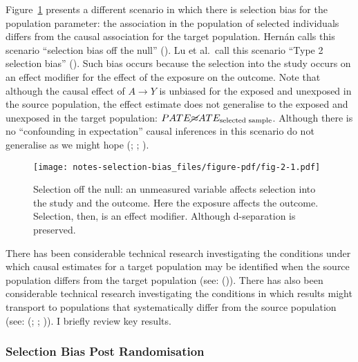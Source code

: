 \documentclass[
  singlecolumn,
  9pt]{article}
\begin{document}
Figure~\ref{fig-2} presents a different scenario in which there is
selection bias for the population parameter: the association in the
population of selected individuals differs from the causal association
for the target population. Hernán calls this scenario ``selection bias
off the null'' (). Lu et
al.~call this scenario ``Type 2 selection bias''
(). Such bias occurs because
the selection into the study occurs on an effect modifier for the effect
of the exposure on the outcome. Note that although the causal effect of
\(A\to Y\) is unbiased for the exposed and unexposed in the source
population, the effect estimate does not generalise to the exposed and
unexposed in the target population:
\(PATE \cancel{\approx} ATE_{\text{selected sample}}\). Although there
is no ``confounding in expectation'' causal inferences in this scenario
do not generalise as we might hope (; ; ).

\begin{figure}

{\centering \texttt{[image: notes-selection-bias\_files/figure-pdf/fig-2-1.pdf]}

}

\caption{\label{fig-2}Selection off the null: an unmeasured variable
affects selection into the study and the outcome. Here the exposure
affects the outcome. Selection, then, is an effect modifier. Although
d-separation is preserved.}

\end{figure}

There has been considerable technical research investigating the
conditions under which causal estimates for a target population may be
identified when the source population differs from the target population
(see: ()). There has also
been considerable technical research investigating the conditions in
which results might transport to populations that systematically differ
from the source population (see:
(;
;
)). I briefly review key
results.

\subsubsection{Selection Bias Post
Randomisation}\label{selection-bias-post-randomisation-1}
\end{document}
